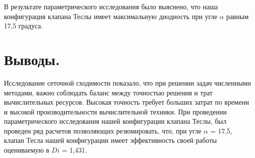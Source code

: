 \documentclass[10pt,a4paper]{book}
\begin{document}
         В результате параметрического исследования было выяснено, что наша конфигурация клапана Теслы имеет максимальную диодность при угле $ \alpha $ равным 17,5 градуса. 
         
         \section*{Выводы.}
         
         Исследование сеточной сходимости показало, что при решении задач численными методами, важно соблюдать баланс между точностью решения и трат вычислительных ресурсов. Высокая точность требует больших затрат по времени и высокой производительности вычислительной техники. При проведении параметрического исследования нашей конфигурации клапана Теслы, был проведен ряд расчетов позволяющих резюмировать, что, при угле $\alpha$  = 17,5\textdegree, клапан Тесла нашей конфигурации имеет эффективность своей работы оцениваемую в $Di$ = 1,431.
         
         
         
                 
\end{document}
